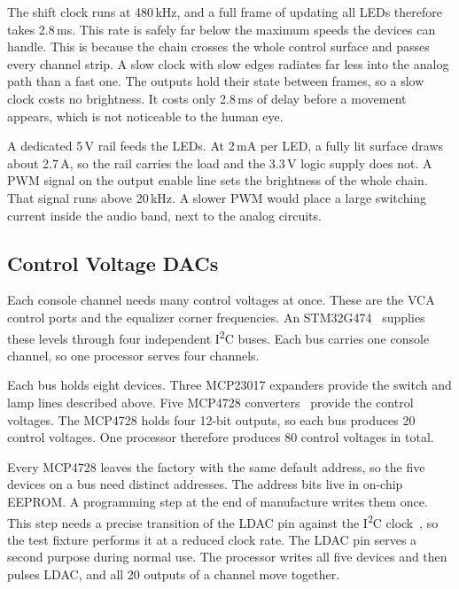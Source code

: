 \documentclass[11pt, letterpaper,titlepage]{article}
\begin{document}
 
The shift clock runs at 480\,kHz, and a full frame of updating all LEDs therefore takes 2.8\,ms. This
rate is safely far below the maximum speeds the devices can handle. This is because the
chain crosses the whole control surface and passes every channel strip. A slow
clock with slow edges radiates far less into the analog path than a fast one.
The outputs hold their state between frames, so a slow clock costs no
brightness. It costs only 2.8\,ms of delay before a movement appears, which is not noticeable to the human eye.
 
A dedicated 5\,V rail feeds the LEDs. At 2\,mA per LED, a fully lit surface
draws about 2.7\,A, so the rail carries the load and the 3.3\,V logic supply does
not. A PWM signal on the output enable line sets the brightness of the whole
chain. That signal runs above 20\,kHz. A slower PWM would place a large
switching current inside the audio band, next to the analog circuits.
 




\subsection{Control Voltage DACs}
\label{ssec:cv-dacs}

Each console channel needs many control voltages at once. These are the VCA control
ports and the equalizer corner frequencies. An STM32G474~\cite{stm32g474} supplies these levels
through four independent I\textsuperscript{2}C buses. Each bus carries one
console channel, so one processor serves four channels.

Each bus holds eight devices. Three MCP23017 expanders provide the switch and
lamp lines described above. Five MCP4728 converters~\cite{mcp4728} provide the control
voltages. The MCP4728 holds four 12-bit outputs, so each bus produces 20
control voltages. One processor therefore produces 80 control voltages in
total.

Every MCP4728 leaves the factory with the same default address, so the five
devices on a bus need distinct addresses. The address bits live in on-chip
EEPROM. A programming step at the end of manufacture writes them once. This
step needs a precise transition of the LDAC pin against the I\textsuperscript{2}C
clock~\cite{mcp4728}, so the test fixture performs it at a reduced clock rate. The LDAC pin
serves a second purpose during normal use. The processor writes all five
devices and then pulses LDAC, and all 20 outputs of a channel move together.
\end{document}
